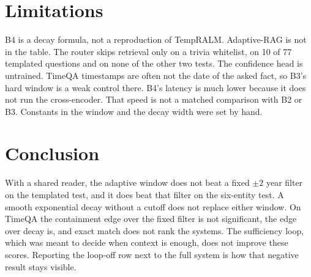 \documentclass[sigconf,anonymous,review]{acmart}
\begin{document}
\section{Limitations}

B4 is a decay formula, not a reproduction of TempRALM.
Adaptive-RAG is not in the table.
The router skips retrieval only on a trivia whitelist, on 10 of 77 templated questions and on none of the other two tests.
The confidence head is untrained.
TimeQA timestamps are often not the date of the asked fact, so B3's hard window is a weak control there.
B4's latency is much lower because it does not run the cross-encoder.
That speed is not a matched comparison with B2 or B3.
Constants in the window and the decay width were set by hand.

\section{Conclusion}

With a shared reader, the adaptive window does not beat a fixed $\pm 2$ year filter on the templated test, and it does beat that filter on the six-entity test.
A smooth exponential decay without a cutoff does not replace either window.
On TimeQA the containment edge over the fixed filter is not significant, the edge over decay is, and exact match does not rank the systems.
The sufficiency loop, which was meant to decide when context is enough, does not improve these scores.
Reporting the loop-off row next to the full system is how that negative result stays visible.



\end{document}
